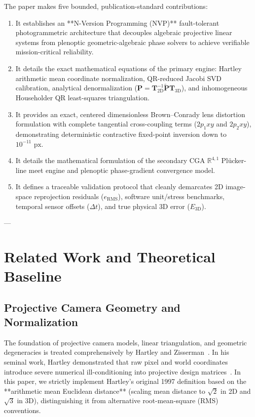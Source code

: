 \documentclass[journal]{IEEEtran}
\newcommand{\bP}{\mathbf{P}}
\newcommand{\bT}{\mathbf{T}}
\begin{document}
The paper makes five bounded, publication-standard contributions:
\begin{enumerate}
    \item It establishes an **N-Version Programming (NVP)** fault-tolerant photogrammetric architecture that decouples algebraic projective linear systems from plenoptic geometric-algebraic phase solvers to achieve verifiable mission-critical reliability.
    \item It details the exact mathematical equations of the primary engine: Hartley arithmetic mean coordinate normalization, QR-reduced Jacobi SVD calibration, analytical denormalization ($\bP = \bT_{2\mathrm{D}}^{-1}\tilde{\bP}\bT_{3\mathrm{D}}$), and inhomogeneous Householder QR least-squares triangulation.
    \item It provides an exact, centered dimensionless Brown--Conrady lens distortion formulation with complete tangential cross-coupling terms ($2p_1xy$ and $2p_2xy$), demonstrating deterministic contractive fixed-point inversion down to $10^{-11}\text{ px}$.
    \item It details the mathematical formulation of the secondary CGA $\mathbb{R}^{4,1}$ Plücker-line meet engine and plenoptic phase-gradient convergence model.
    \item It defines a traceable validation protocol that cleanly demarcates 2D image-space reprojection residuals ($e_{\mathrm{RMS}}$), software unit/stress benchmarks, temporal sensor offsets ($\Delta t$), and true physical 3D error ($E_{\mathrm{3D}}$).
\end{enumerate}

---

\section{Related Work and Theoretical Baseline}

\subsection{Projective Camera Geometry and Normalization}
The foundation of projective camera models, linear triangulation, and geometric degeneracies is treated comprehensively by Hartley and Zisserman~\cite{hartley2004multiple}. In his seminal work, Hartley demonstrated that raw pixel and world coordinates introduce severe numerical ill-conditioning into projective design matrices~\cite{hartley1997defense}. In this paper, we strictly implement Hartley's original 1997 definition based on the **arithmetic mean Euclidean distance** (scaling mean distance to $\sqrt{2}$ in 2D and $\sqrt{3}$ in 3D), distinguishing it from alternative root-mean-square (RMS) conventions.
\end{document}
